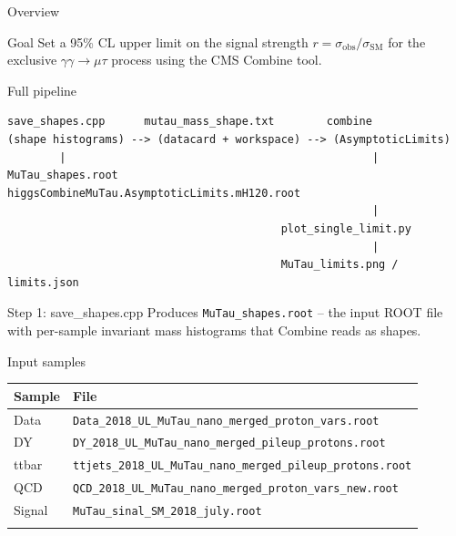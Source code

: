 \begin{frame}[fragile]{Overview}
\protect{}\label{overview}
\begin{block}{Goal}
\protect{}\label{goal}
Set a 95\% CL upper limit on the signal strength
\(r = \sigma_\text{obs} / \sigma_\text{SM}\) for the exclusive
\(\gamma\gamma \to \mu\tau\) process using the CMS Combine tool.
\end{block}

\begin{block}{Full pipeline}
\protect{}\label{full-pipeline}
\begin{verbatim}
save_shapes.cpp      mutau_mass_shape.txt        combine
(shape histograms) --> (datacard + workspace) --> (AsymptoticLimits)
        |                                               |
MuTau_shapes.root                    higgsCombineMuTau.AsymptoticLimits.mH120.root
                                                        |
                                          plot_single_limit.py
                                                        |
                                          MuTau_limits.png / limits.json
\end{verbatim}
\end{block}
\end{frame}

\begin{frame}[fragile]{Step 1: save\_shapes.cpp}
\protect{}\label{step-1-save_shapes.cpp}
Produces \texttt{MuTau\_shapes.root} -- the input ROOT file with
per-sample invariant mass histograms that Combine reads as shapes.

\begin{block}{Input samples}
\protect{}\label{input-samples}
\begin{longtable}[]{@{}ll@{}}
\toprule\noalign{}
Sample & File \\
\midrule\noalign{}
\endhead
Data &
\texttt{Data\_2018\_UL\_MuTau\_nano\_merged\_proton\_vars.root} \\
DY & \texttt{DY\_2018\_UL\_MuTau\_nano\_merged\_pileup\_protons.root} \\
ttbar &
\texttt{ttjets\_2018\_UL\_MuTau\_nano\_merged\_pileup\_protons.root} \\
QCD &
\texttt{QCD\_2018\_UL\_MuTau\_nano\_merged\_proton\_vars\_new.root} \\
Signal & \texttt{MuTau\_sinal\_SM\_2018\_july.root} \\
\bottomrule\noalign{}
\end{longtable}
\end{block}
\end{frame}

